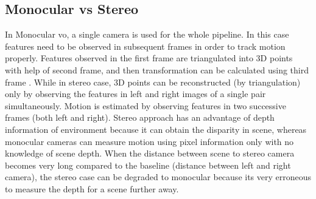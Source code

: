\subsection{Monocular vs Stereo}
In Monocular \acrshort{vo}, a single camera is used for the whole pipeline. In this case features need to be observed in subsequent frames in order to track motion properly. Features observed in the first frame are triangulated into 3D points with help of second frame, and then transformation can be calculated using third frame \cite{KhalidYousif-et-al-2015}. While in stereo case, 3D points can be reconstructed (by triangulation) only by observing the features in left and right images of a single pair simultaneously. Motion is estimated by observing features in two successive frames (both left and right). Stereo approach has an advantage of depth information of environment because it can obtain the disparity in scene, whereas monocular cameras can measure motion using pixel information only with no knowledge of scene depth. When the distance between scene to stereo camera becomes very long compared to the baseline (distance between left and right camera), the stereo case can be degraded to monocular because its very erroneous to measure the depth for a scene further away. 

